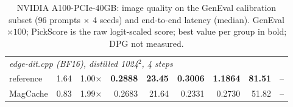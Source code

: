 \begin{table}[t]
\begin{tabular}{lrrrrrrrr}
\midrule
\multicolumn{9}{l}{\textit{edge-dit.cpp (BF16), distilled 1024$^2$, 4 steps}} \\
\quad reference & 1.64 & 1.00$\times$ & \textbf{0.2888} & \textbf{23.45} & \textbf{0.3006} & \textbf{1.1864} & \textbf{81.51} & – \\
\quad MagCache & 0.83 & 1.99$\times$ & 0.2683 & 21.64 & 0.2331 & 0.2730 & 51.82 & – \\
\bottomrule
\end{tabular}
\caption{NVIDIA A100-PCIe-40GB: image quality on the GenEval calibration subset (96 prompts $\times$ 4 seeds) and end-to-end latency (median). GenEval $\times 100$; PickScore is the raw logit-scaled score; best value per group in bold; DPG not measured.}
\end{table}
